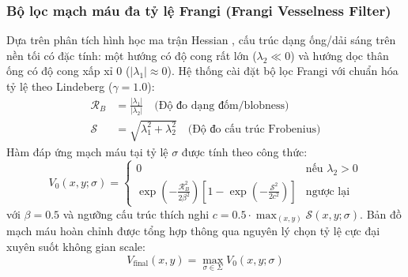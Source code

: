 \subsubsection{Bộ lọc mạch máu đa tỷ lệ Frangi (Frangi Vesselness Filter)}
Dựa trên phân tích hình học ma trận Hessian \cite{frangi1998multiscale}, cấu trúc dạng ống/dải sáng trên nền tối có đặc tính: một hướng có độ cong rất lớn ($\lambda_2 \ll 0$) và hướng dọc thân ống có độ cong xấp xỉ 0 ($|\lambda_1| \approx 0$).
Hệ thống cài đặt bộ lọc Frangi với chuẩn hóa tỷ lệ theo Lindeberg \cite{lindeberg1998feature} ($\gamma = 1.0$):
\begin{align}
\mathcal{R}_B &= \frac{|\lambda_1|}{|\lambda_2|} \quad \text{(Độ đo dạng đốm/blobness)} \\
\mathcal{S} &= \sqrt{\lambda_1^2 + \lambda_2^2} \quad \text{(Độ đo cấu trúc Frobenius)}
\end{align}
Hàm đáp ứng mạch máu tại tỷ lệ $\sigma$ được tính theo công thức:
\begin{equation}
V_0(x, y; \sigma) = \begin{cases} 
0 & \text{nếu } \lambda_2 > 0 \\
\exp\left(-\frac{\mathcal{R}_B^2}{2\beta^2}\right) \left[ 1 - \exp\left(-\frac{\mathcal{S}^2}{2c^2}\right) \right] & \text{ngược lại}
\end{cases}
\end{equation}
với $\beta = 0.5$ và ngưỡng cấu trúc thích nghi $c = 0.5 \cdot \max_{(x,y)} \mathcal{S}(x, y; \sigma)$.
Bản đồ mạch máu hoàn chỉnh được tổng hợp thông qua nguyên lý chọn tỷ lệ cực đại xuyên suốt không gian scale:
\begin{equation}
V_{\text{final}}(x, y) = \max_{\sigma \in \Sigma} V_0(x, y; \sigma)
\end{equation}

